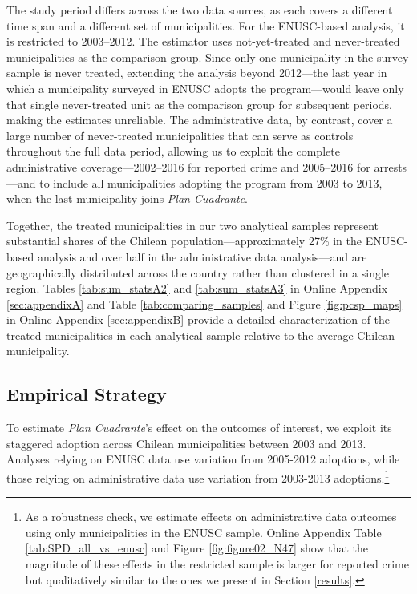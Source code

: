 The study period differs across the two data sources, as each covers a different time span and a different set of municipalities. For the ENUSC-based analysis, it is restricted to 2003--2012. The \citet{Callaway} estimator uses not-yet-treated and never-treated municipalities as the comparison group. Since only one municipality in the survey sample is never treated, extending the analysis beyond 2012---the last year in which a municipality surveyed in ENUSC adopts the program---would leave only that single never-treated unit as the comparison group for subsequent periods, making the estimates unreliable. The administrative data, by contrast, cover a large number of never-treated municipalities that can serve as controls throughout the full data period, allowing us to exploit the complete administrative coverage---2002--2016 for reported crime and 2005--2016 for arrests---and to include all municipalities adopting the program from 2003 to 2013, when the last municipality joins \emph{Plan Cuadrante}.


Together, the treated municipalities in our two analytical samples represent substantial shares of the Chilean population---approximately 27\% in the ENUSC-based analysis and over half in the administrative data analysis---and are geographically distributed across the country rather than clustered in a single region. Tables \ref{tab:sum_statsA2} and \ref{tab:sum_statsA3} in Online Appendix \ref{sec:appendixA} and Table \ref{tab:comparing_samples} and Figure \ref{fig:pcsp_maps} in Online Appendix \ref{sec:appendixB} provide a detailed characterization of the treated municipalities in each analytical sample relative to the average Chilean municipality.

\subsection{Empirical Strategy}

To estimate \emph{Plan Cuadrante}'s effect on the outcomes of interest, we exploit its staggered adoption across Chilean municipalities between 2003 and 2013. Analyses relying on ENUSC data use variation from 2005-2012 adoptions, while those relying on administrative data use variation from 2003-2013 adoptions.\footnote{As a robustness check, we estimate effects on administrative data outcomes using only municipalities in the
ENUSC sample. Online Appendix Table \ref{tab:SPD_all_vs_enusc} and Figure \ref{fig:figure02_N47} show that the magnitude of these effects in the restricted sample is larger for reported crime but qualitatively similar
to the ones we present in Section \ref{results}.}

